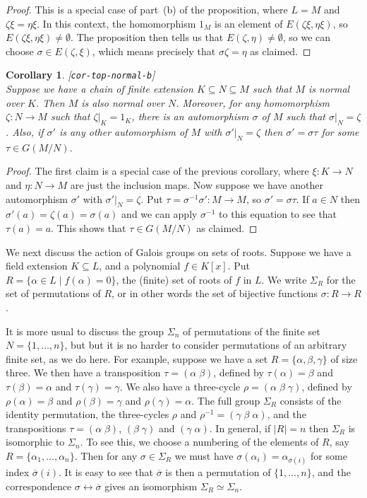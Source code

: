 \documentclass{amsart}
\newcommand{\lbl}[1]{\label{#1}\textup{[\texttt{#1}]}\ \\}
\newcommand{\lbl}{\label}
\newcommand{\al}        {\alpha}
\newcommand{\bt}        {\beta}
\newcommand{\gm}        {\gamma}
\newcommand{\zt}        {\zeta}
\newcommand{\sg}        {\sigma}
\newcommand{\Sg}        {\Sigma}
\newcommand{\ov}[1]     {\overline{#1}}
\newcommand{\st}        {\;|\;}
\newcommand{\sse}       {\subseteq}
\renewcommand{\:}{\colon}
\newtheorem{corollary}[theorem]{Corollary}
\theoremstyle{definition}
\begin{document}
\begin{proof}
 This is a special case of part~(b) of the proposition, where $L=M$
 and $\zt\xi=\eta\xi$.  In this context, the homomorphism $1_M$ is an
 element of $E(\zt\xi,\eta\xi)$, so $E(\zt\xi,\eta\xi)\neq\emptyset$.
 The proposition then tells us that $E(\zt,\eta)\neq\emptyset$, so we
 can choose $\sg\in E(\zt,\xi)$, which means precisely that
 $\sg\zt=\eta$ as claimed.
\end{proof}
\begin{corollary}\lbl{cor-top-normal-b}
 Suppose we have a chain of finite extension $K\sse N\sse M$ such that
 $M$ is normal over $K$.  Then $M$ is also normal over $N$.  Moreover,
 for any homomorphism $\zt\:N\to M$ such that $\zt|_K=1_K$, there is
 an automorphism $\sg$ of $M$ such that $\sg|_N=\zt$.  Also, if
 $\sg'$ is any other automorphism of $M$ with $\sg'|_N=\zt$ then
 $\sg'=\sg\tau$ for some $\tau\in G(M/N)$.
\end{corollary}
\begin{proof}
 The first claim is a special case of the previous corollary, where
 $\xi\:K\to N$ and $\eta\:N\to M$ are just the inclusion maps.  Now
 suppose we have another automorphism $\sg'$ with $\sg'|_N=\zt$.
 Put $\tau=\sg^{-1}\sg'\:M\to M$, so $\sg'=\sg\tau$.  If $a\in N$ then
 $\sg'(a)=\zt(a)=\sg(a)$ and we can apply $\sg^{-1}$ to this equation
 to see that $\tau(a)=a$.  This shows that $\tau\in G(M/N)$ as
 claimed.   
\end{proof}

We next discuss the action of Galois groups on sets of roots.  Suppose
we have a field extension $K\sse L$, and a polynomial $f\in K[x]$.
Put $R=\{\al\in L\st f(\al)=0\}$, the (finite) set of roots of $f$ in
$L$.  We write $\Sg_R$ for the set of permutations of $R$, or in other
words the set of bijective functions $\sg\:R\to R$.

It is more usual to discuss the group $\Sg_n$ of permutations of the
finite set $N=\{1,\dotsc,n\}$, but but it is no harder to consider
permutations of an arbitrary finite set, as we do here.  For example,
suppose we have a set $R=\{\al,\bt,\gm\}$ of size three.  We then have
a transposition $\tau=(\al\;\bt)$, defined by $\tau(\al)=\bt$ and
$\tau(\bt)=\al$ and $\tau(\gm)=\gm$.  We also have a three-cycle
$\rho=(\al\;\bt\;\gm)$, defined by $\rho(\al)=\bt$ and $\rho(\bt)=\gm$
and $\rho(\gm)=\al$.  The full group $\Sg_R$ consists of the identity
permutation, the three-cycles $\rho$ and $\rho^{-1}=(\gm\;\bt\;\al)$,
and the transpositions $\tau=(\al\;\bt)$, $(\bt\;\gm)$ and
$(\gm\;\al)$.  In general, if $|R|=n$ then $\Sg_R$ is isomorphic to
$\Sg_n$.  To see this, we choose a numbering of the elements of $R$,
say $R=\{\al_1,\dotsc,\al_n\}$.  Then for any $\sg\in\Sg_R$ we must
have $\sg(\al_i)=\al_{\ov{\sg}(i)}$ for some index $\ov{\sg}(i)$.  It
is easy to see that $\ov{\sg}$ is then a permutation of
$\{1,\dotsc,n\}$, and the correspondence $\sg\leftrightarrow\ov{\sg}$
gives an isomorphism $\Sg_R\simeq\Sg_n$.
\end{document}
